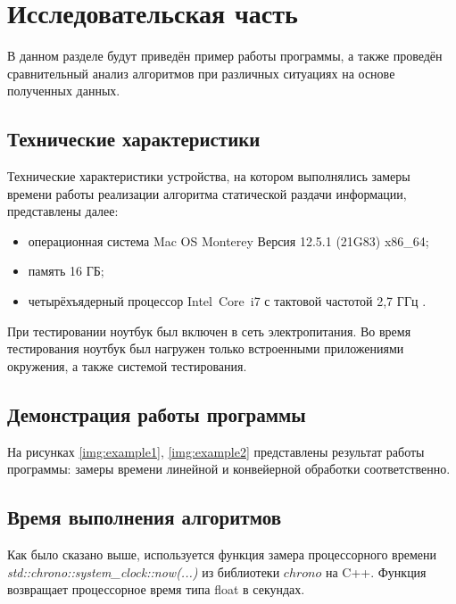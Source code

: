 \chapter{Исследовательская часть}

В данном разделе будут приведён пример работы программы, а также проведён сравнительный анализ алгоритмов при различных ситуациях на основе полученных данных.

\section{Технические характеристики}

Технические характеристики устройства, на котором выполнялись замеры времени работы реализации алгоритма статической раздачи информации, представлены далее:

\begin{itemize}
	\item операционная система Mac OS Monterey Версия 12.5.1 (21G83) \cite{macos} x86\_64;
	\item память 16 ГБ;
	\item четырёхъядерный процессор Intel Core i7 с тактовой частотой 2,7 ГГц \cite{intel}.
\end{itemize}

При тестировании ноутбук был включен в сеть электропитания. Во время тестирования ноутбук был нагружен только встроенными приложениями окружения, а также системой тестирования.

\section{Демонстрация работы программы}

На рисунках \ref{img:example1}, \ref{img:example2} представлены результат работы программы: замеры времени линейной и конвейерной обработки соответственно.

\clearpage

\section{Время выполнения алгоритмов}

Как было сказано выше, используется функция замера процессорного времени \textit{std::chrono::system\_clock::now(...)} из библиотеки $chrono$ на C++. Функция возвращает процессорное время типа float в секундах.

